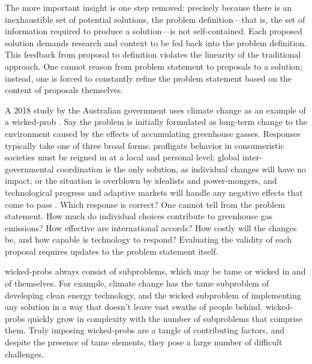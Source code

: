 The more important insight is one step removed: precisely because there is an inexhaustible set of potential solutions,
the problem definition---that is, the set of information required to produce a solution---is not self-contained. Each
proposed solution demands research and context to be fed back into the problem definition. This feedback from proposal
to definition violates the linearity of the traditional approach. One cannot reason from problem statement to proposals
to a solution; instead, one is forced to constantly refine the problem statement based on the content of proposals
themselves.

A 2018 study by the Australian government uses climate change as an example of a \ac{wicked-prob}
\cite{commission_tackling_2018}. Say the problem is initially formulated as long-term change to the environment caused
by the effects of accumulating greenhouse gasses. Responses typically take one of three broad forms: profligate behavior
in consumeristic societies must be reigned in at a local and personal level; global inter-governmental coordination is
the only solution, as individual changes will have no impact; or the situation is overblown by idealists and
power-mongers, and technological progress and adaptive markets will handle any negative effects that come to pass
\cite{commission_tackling_2018}. Which response is correct? One cannot tell from the problem statement. How much do
individual choices contribute to greenhouse gas emissions? How effective are international accords? How costly will the
changes be, and how capable is technology to respond? Evaluating the validity of each proposal requires updates to the
problem statement itself.


\Acp{wicked-prob} always consist of subproblems, which may be tame or wicked in and of themselves. For example, climate
change has the tame subproblem of developing clean energy technology, and the wicked subproblem of implementing any
solution in a way that doesn't leave vast swaths of people behind. \Acp{wicked-prob} quickly grow in complexity with the
number of subproblems that comprise them. Truly imposing \acp{wicked-prob} are a tangle of contributing factors, and
despite the presence of tame elements, they pose a large number of difficult challenges.

